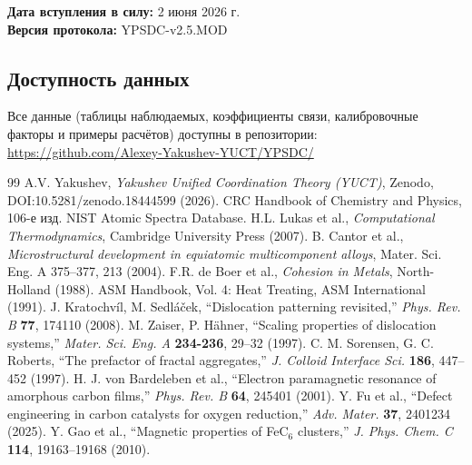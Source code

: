 \documentclass[12pt,a4paper]{article}
\begin{document}
	\vspace{0.3cm}
	\noindent \textbf{Дата вступления в силу:} 2 июня 2026 г. \\
	\textbf{Версия протокола:} YPSDC-v2.5.MOD
	
	
	\subsection{Доступность данных}
	
	Все данные (таблицы наблюдаемых, коэффициенты связи, калибровочные факторы и примеры расчётов) доступны в репозитории:
	\url{https://github.com/Alexey-Yakushev-YUCT/YPSDC/}
	
	\begin{thebibliography}{99}
		 A.V. Yakushev, \emph{Yakushev Unified Coordination Theory (YUCT)}, Zenodo, DOI:10.5281/zenodo.18444599 (2026).
		 CRC Handbook of Chemistry and Physics, 106-е изд.
		 NIST Atomic Spectra Database.
		 H.L. Lukas et al., \emph{Computational Thermodynamics}, Cambridge University Press (2007).
		 B. Cantor et al., \emph{Microstructural development in equiatomic multicomponent alloys}, Mater. Sci. Eng. A 375–377, 213 (2004).
		 F.R. de Boer et al., \emph{Cohesion in Metals}, North-Holland (1988).
		 ASM Handbook, Vol. 4: Heat Treating, ASM International (1991).
		 J. Kratochv\'il, M. Sedl\'a\v{c}ek, ``Dislocation patterning revisited,'' \emph{Phys. Rev. B} \textbf{77}, 174110 (2008).
		 M. Zaiser, P. H\"ahner, ``Scaling properties of dislocation systems,'' \emph{Mater. Sci. Eng. A} \textbf{234-236}, 29–32 (1997).
		 C. M. Sorensen, G. C. Roberts, ``The prefactor of fractal aggregates,'' \emph{J. Colloid Interface Sci.} \textbf{186}, 447–452 (1997).
		 H. J. von Bardeleben et al., ``Electron paramagnetic resonance of amorphous carbon films,'' \emph{Phys. Rev. B} \textbf{64}, 245401 (2001).
		 Y. Fu et al., ``Defect engineering in carbon catalysts for oxygen reduction,'' \emph{Adv. Mater.} \textbf{37}, 2401234 (2025).
		 Y. Gao et al., ``Magnetic properties of FeC$_6$ clusters,'' \emph{J. Phys. Chem. C} \textbf{114}, 19163–19168 (2010).
	\end{thebibliography}
	
	
	
\end{document}
